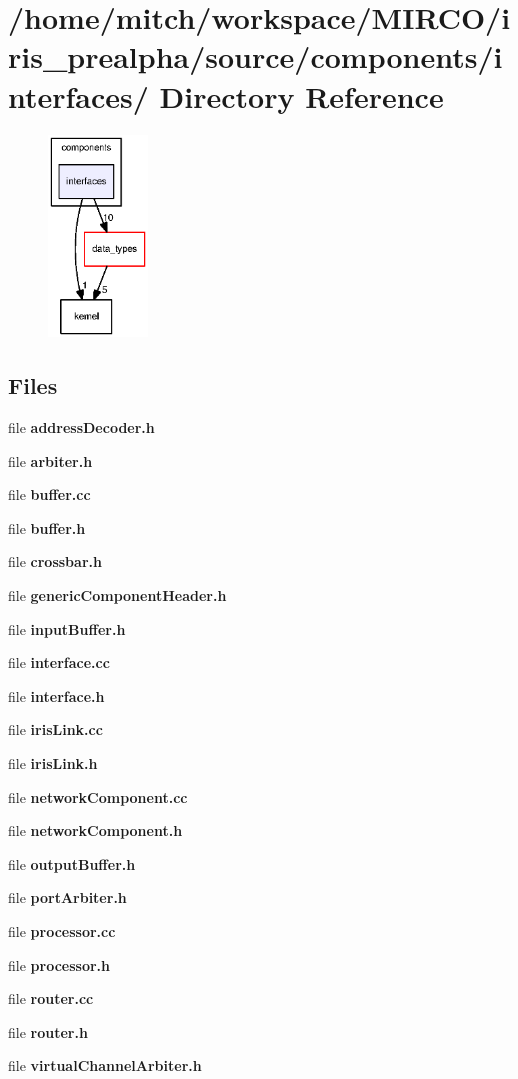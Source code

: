 \section{/home/mitch/workspace/MIRCO/iris\_\-prealpha/source/components/interfaces/ Directory Reference}
\label{dir_fc6aa0198a09d10979d32a579cf3e3b3}


\nopagebreak
\begin{figure}[H]
\begin{center}
\leavevmode
\includegraphics[width=75pt]{dir_fc6aa0198a09d10979d32a579cf3e3b3_dep}
\end{center}
\end{figure}
\subsection*{Files}
\begin{CompactItemize}
\item 
file {\bf addressDecoder.h}
\item 
file {\bf arbiter.h}
\item 
file {\bf buffer.cc}
\item 
file {\bf buffer.h}
\item 
file {\bf crossbar.h}
\item 
file {\bf genericComponentHeader.h}
\item 
file {\bf inputBuffer.h}
\item 
file {\bf interface.cc}
\item 
file {\bf interface.h}
\item 
file {\bf irisLink.cc}
\item 
file {\bf irisLink.h}
\item 
file {\bf networkComponent.cc}
\item 
file {\bf networkComponent.h}
\item 
file {\bf outputBuffer.h}
\item 
file {\bf portArbiter.h}
\item 
file {\bf processor.cc}
\item 
file {\bf processor.h}
\item 
file {\bf router.cc}
\item 
file {\bf router.h}
\item 
file {\bf virtualChannelArbiter.h}
\end{CompactItemize}
